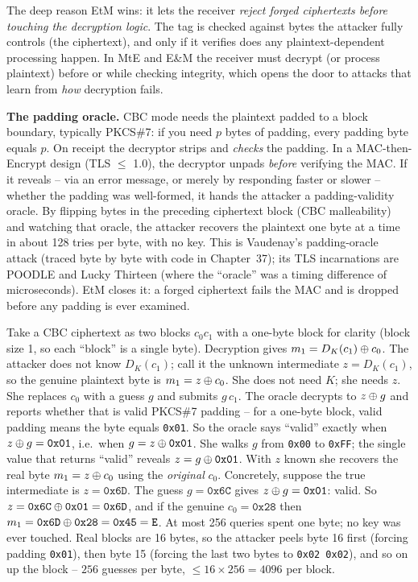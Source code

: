 The deep reason EtM wins: it lets the receiver \emph{reject forged ciphertexts before touching the decryption logic}. The tag is checked against bytes the attacker fully controls (the ciphertext), and only if it verifies does any plaintext-dependent processing happen. In MtE and E\&M the receiver must decrypt (or process plaintext) before or while checking integrity, which opens the door to attacks that learn from \emph{how} decryption fails.

\begin{attackbox}
\textbf{The padding oracle.} CBC mode needs the plaintext padded to a block boundary, typically PKCS\#7: if you need $p$ bytes of padding, every padding byte equals $p$. On receipt the decryptor strips and \emph{checks} the padding. In a MAC-then-Encrypt design (TLS $\le$ 1.0), the decryptor unpads \emph{before} verifying the MAC. If it reveals -- via an error message, or merely by responding faster or slower -- whether the padding was well-formed, it hands the attacker a padding-validity oracle. By flipping bytes in the preceding ciphertext block (CBC malleability) and watching that oracle, the attacker recovers the plaintext one byte at a time in about 128 tries per byte, with no key. This is Vaudenay's padding-oracle attack (traced byte by byte with code in Chapter~37); its TLS incarnations are POODLE and Lucky Thirteen (where the ``oracle'' was a timing difference of microseconds). EtM closes it: a forged ciphertext fails the MAC and is dropped before any padding is ever examined.
\end{attackbox}

\begin{example}
\label{ch38:ex-padding-num}
Take a CBC ciphertext as two blocks $c_0 c_1$ with a one-byte block for clarity (block size 1, so each ``block'' is a single byte). Decryption gives $m_1 = D_K(c_1) \oplus c_0$. The attacker does not know $D_K(c_1)$; call it the unknown intermediate $z = D_K(c_1)$, so the genuine plaintext byte is $m_1 = z \oplus c_0$. She does not need $K$; she needs $z$. She replaces $c_0$ with a guess $g$ and submits $g\,c_1$. The oracle decrypts to $z \oplus g$ and reports whether that is valid PKCS\#7 padding -- for a one-byte block, valid padding means the byte equals \texttt{0x01}. So the oracle says ``valid'' exactly when $z \oplus g = \texttt{0x01}$, i.e.\ when $g = z \oplus \texttt{0x01}$. She walks $g$ from \texttt{0x00} to \texttt{0xFF}; the single value that returns ``valid'' reveals $z = g \oplus \texttt{0x01}$. With $z$ known she recovers the real byte $m_1 = z \oplus c_0$ using the \emph{original} $c_0$. Concretely, suppose the true intermediate is $z = \texttt{0x6D}$. The guess $g = \texttt{0x6C}$ gives $z\oplus g = \texttt{0x01}$: valid. So $z = \texttt{0x6C}\oplus\texttt{0x01} = \texttt{0x6D}$, and if the genuine $c_0 = \texttt{0x28}$ then $m_1 = \texttt{0x6D}\oplus\texttt{0x28} = \texttt{0x45} = \texttt{E}$. At most 256 queries spent one byte; no key was ever touched. Real blocks are 16 bytes, so the attacker peels byte 16 first (forcing padding \texttt{0x01}), then byte 15 (forcing the last two bytes to \texttt{0x02 0x02}), and so on up the block -- $256$ guesses per byte, $\le 16\times256 = 4096$ per block.
\end{example}


